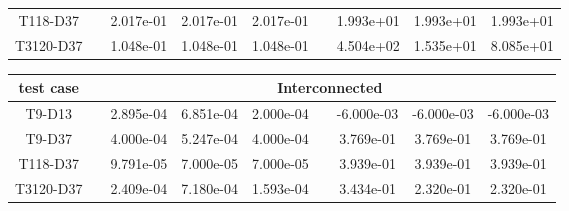 \begin{table}[h]
\begin{adjustbox}{width=1\textwidth}
\begin{tabular}{ccccccccc}
T118-D37     &&  2.017e-01 &  2.017e-01 &  2.017e-01 &&  1.993e+01 &  1.993e+01 &  1.993e+01 \\
T3120-D37    &&  1.048e-01 &  1.048e-01 &  1.048e-01 &&  4.504e+02 &  1.535e+01 &  8.085e+01 \\
\bottomrule
\end{tabular}
\end{adjustbox}
\begin{adjustbox}{width=1\textwidth} %
\small
\begin{tabular}{ccccccccc}
\toprule
{test case} && \multicolumn{7}{c}{Interconnected}   \\
\midrule
T9-D13    &&  2.895e-04 &  6.851e-04 &  2.000e-04 &&  -6.000e-03 &  -6.000e-03 &  -6.000e-03 \\
T9-D37    &&  4.000e-04 &  5.247e-04 &  4.000e-04 &&   3.769e-01 &   3.769e-01 &   3.769e-01 \\
T118-D37  &&  9.791e-05 &  7.000e-05 &  7.000e-05 &&   3.939e-01 &   3.939e-01 &   3.939e-01 \\
T3120-D37 &&  2.409e-04 &  7.180e-04 &  1.593e-04 &&   3.434e-01 &   2.320e-01 &   2.320e-01 \\
\bottomrule
\end{tabular}
\end{adjustbox}


\end{table}
